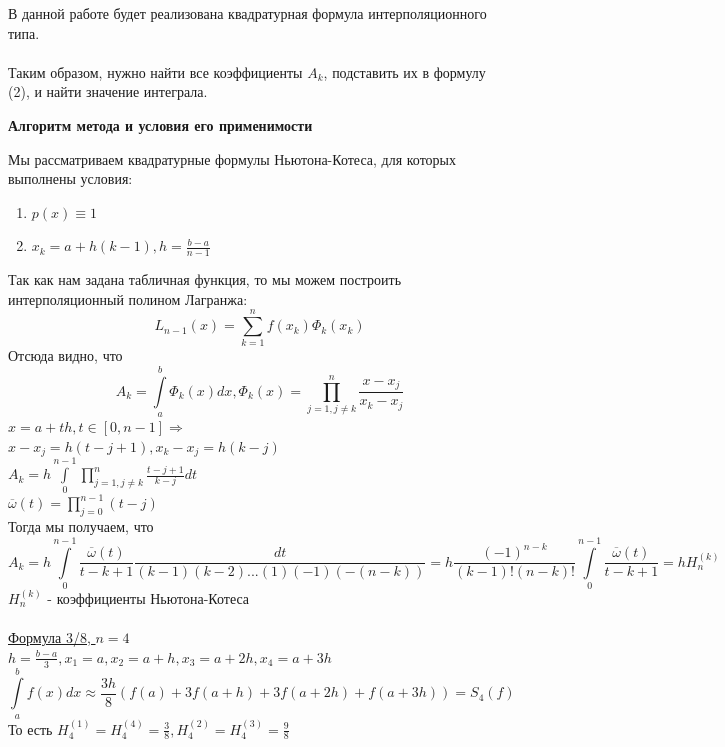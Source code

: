 \documentclass{article}
\begin{document}
	В данной работе будет реализована квадратурная формула интерполяционного типа.\\
	\\
	Таким образом, нужно найти все коэффициенты $A_k$, подставить их в формулу (2), и найти значение интеграла.
	\begin{center} \textbf{Алгоритм метода и условия его применимости}\end{center}
	Мы рассматриваем квадратурные формулы Ньютона-Котеса, для которых выполнены условия:
	\begin{enumerate}
		\item $p(x) \equiv 1$
		\item $x_k = a + h(k-1), h = \frac{b-a}{n-1}$
	\end{enumerate}
	Так как нам задана табличная функция, то мы можем построить интерполяционный полином Лагранжа:
	\begin{equation}
		L_{n-1}(x) = \sum_{k=1}^{n}f(x_k)\Phi_k(x_k)
	\end{equation}
	Отсюда видно, что 
	\begin{equation}
		A_k = \int\limits_{a}^{b}\Phi_k(x)dx, \Phi_k(x) = \prod_{j=1, j\neq k}^{n}\frac{x-x_j}{x_k-x_j}
	\end{equation}
	$x=a+th, t \in [0, n-1] \Rightarrow$\\
	$x-x_j = h(t-j+1), x_k-x_j = h(k - j)$\\
	$A_k = h\int\limits_{0}^{n-1}\prod\limits_{j=1, j\neq k}^{n}\frac{t-j+1}{k-j}dt$\\
	$\overline{\omega}(t) = \prod\limits_{j=0}^{n-1}(t-j)$\\
	Тогда мы получаем, что
	\begin{equation}
		A_k=h\int\limits_{0}^{n-1}\frac{\overline{\omega}(t)}{t-k+1}\frac{dt}{(k-1)(k-2)...(1)(-1)(-(n-k))} =  h\frac{(-1)^{n-k}}{(k-1)!(n-k)!} \int\limits_{0}^{n-1}\frac{\overline{\omega}(t)}{t-k+1} = hH_n^{(k)}
	\end{equation}
	$H_n^{(k)}$ - коэффициенты Ньютона-Котеса\\
	\\
	\underline{Формула 3/8, $n=4$}\\
	$h = \frac{b-a}{3}, x_1 = a, x_2 = a+h, x_3 = a+2h, x_4 = a+3h$
	\begin{equation}
		\int\limits_{a}^{b}f(x)dx \approx \frac{3h}{8}(f(a) + 3f(a+h)+ 3f(a+2h)+ f(a+3h)) = S_4(f)
	\end{equation}
	То есть $H_4^{(1)} = H_4^{(4)} = \frac{3}{8}, H_4^{(2)} = H_4^{(3)} = \frac{9}{8}$\\
\end{document}
